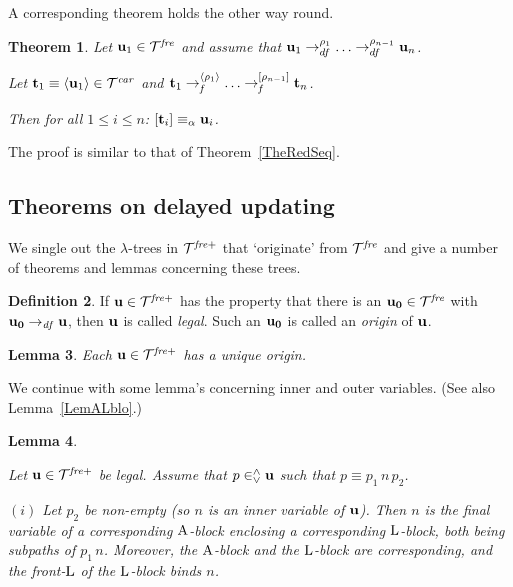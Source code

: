 \documentclass{article}
\theoremstyle{plain}
\newtheorem{The}{Theorem}[section]
\newtheorem{Lem}[The]{Lemma}
\theoremstyle{definition}
\newtheorem{Def}[The]{Definition}
\begin{document}
{\medskip

A corresponding theorem holds the other way round.

\begin{The}\label{TheRedSeq2} Let ${\bf u}_1 \in {\cal T}^{\it fre}$ and assume that ${\bf u}_1 \rightarrow_{df}^{\rho_1}  \ldots \rightarrow_{df}^{\rho_{n-1}} {\bf u}_n$.

Let ${\bf t}_1 \equiv \langle {\bf u}_1 \rangle \in {\cal T}^{\it car}$ and
${\bf t}_1 \rightarrow_{\it f}^{\langle \rho_1 \rangle} \ldots \rightarrow_{\it f}^{[\rho_{n-1}]} {\bf t}_n$.

Then for all $1 \leq i \leq n$: $[{\bf t}_i] \equiv_{\alpha} {\bf u}_i$.
\end{The}

The proof is similar to that of Theorem~\ref{TheRedSeq}.

\subsection{Theorems on delayed updating}\label{SecTheDel}

We single out the $\lambda$-trees in ${\cal T}^{\it fre+}$ that `originate' from ${\cal T}^{\it fre}$ and give a number of theorems and lemmas concerning these trees.

\begin{Def}\label{DefLegOri}
If ${\bf u} \in {\cal T}^{\it fre+}$ has the property that there is an ${\bf u_0} \in {\cal T}^{\it fre}$ with ${\bf u_0} \rightarrow_{\it df} {\bf u}$, then ${\bf u}$ is called {\it legal\/}. Such an ${\bf u_0}$ is called an {\it origin\/} of ${\bf u}$.
\end{Def}

\begin{Lem}\label{LemUniOri}
Each ${\bf u} \in {\cal T}^{\it fre+}$ has a unique origin.
\end{Lem}

We continue with some lemma's concerning inner and outer variables. (See also Lemma~\ref{LemALblo}.)

\begin{Lem}\label{LemInnOut}

Let ${\bf u} \in {\cal T}^{\it fre+}$ be legal. Assume that $p \in^\wedge_\vee {\bf u}$ such that $p \equiv p_1 \, n \, p_2$.

$(i)$ Let $p_2$ be non-empty (so $n$ is an {\em inner\/} variable of ${\bf u}$). Then $n$ is the final variable of a corresponding ${\rm A}$-block enclosing a corresponding ${\rm L}$-block, both being subpaths of $p_1 \, n$. Moreover, the ${\rm A}$-block and the ${\rm L}$-block are corresponding, and the front-${\rm L}$ of the ${\rm L}$-block binds $n$.


\end{Lem}}
\end{document}
